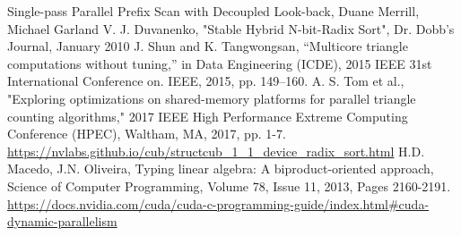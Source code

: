 \documentclass[conference]{IEEEtran}
\begin{document}
\begin{thebibliography}{00}
 Single-pass Parallel Prefix Scan with Decoupled Look-back, Duane Merrill, Michael Garland
 V. J. Duvanenko, "Stable Hybrid N-bit-Radix Sort", Dr. Dobb's Journal, January 2010
 J. Shun and K. Tangwongsan, “Multicore triangle computations without tuning,” in Data Engineering (ICDE), 2015 IEEE 31st International Conference on. IEEE, 2015, pp. 149–160.
 A. S. Tom et al., "Exploring optimizations on shared-memory platforms for parallel triangle counting algorithms," 2017 IEEE High Performance Extreme Computing Conference (HPEC), Waltham, MA, 2017, pp. 1-7.
 \url{https://nvlabs.github.io/cub/structcub_1_1_device_radix_sort.html}
 H.D. Macedo, J.N. Oliveira, Typing linear algebra: A biproduct-oriented approach, Science of Computer Programming, Volume 78, Issue 11, 2013, Pages 2160-2191.
 \url{https://docs.nvidia.com/cuda/cuda-c-programming-guide/index.html#cuda-dynamic-parallelism}
\end{thebibliography}
\end{document}

